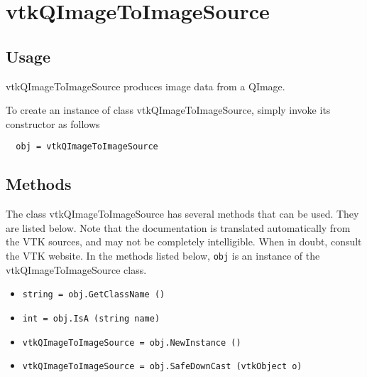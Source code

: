 \section{vtkQImageToImageSource}

\subsection{Usage}

 vtkQImageToImageSource produces image data from a QImage.

To create an instance of class vtkQImageToImageSource, simply
invoke its constructor as follows
\begin{verbatim}
  obj = vtkQImageToImageSource
\end{verbatim}
\subsection{Methods}

The class vtkQImageToImageSource has several methods that can be used.
  They are listed below.
Note that the documentation is translated automatically from the VTK sources,
and may not be completely intelligible.  When in doubt, consult the VTK website.
In the methods listed below, \verb|obj| is an instance of the vtkQImageToImageSource class.
\begin{itemize}
\item  \verb|string = obj.GetClassName ()|

\item  \verb|int = obj.IsA (string name)|

\item  \verb|vtkQImageToImageSource = obj.NewInstance ()|

\item  \verb|vtkQImageToImageSource = obj.SafeDownCast (vtkObject o)|

\end{itemize}
